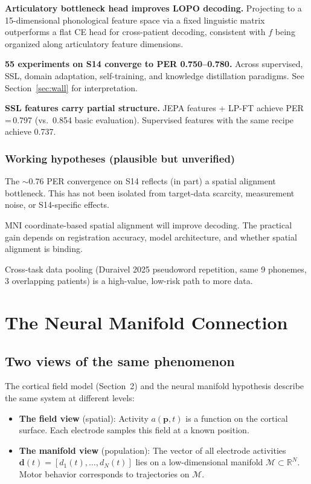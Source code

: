 \documentclass[11pt,letterpaper]{article}
\newcommand{\bfp}{\mathbf{p}}
\newcommand{\bfd}{\mathbf{d}}
\newcommand{\cM}{\mathcal{M}}
\newcommand{\R}{\mathbb{R}}
\begin{document}
\textbf{Articulatory bottleneck head improves LOPO decoding.} Projecting to a 15-dimensional phonological feature space via a fixed linguistic matrix outperforms a flat CE head for cross-patient decoding, consistent with $f$ being organized along articulatory feature dimensions.

\textbf{55 experiments on S14 converge to PER 0.750--0.780.} Across supervised, SSL, domain adaptation, self-training, and knowledge distillation paradigms. See Section~\ref{sec:wall} for interpretation.

\textbf{SSL features carry partial structure.} JEPA features + LP-FT achieve PER\,=\,0.797 (vs.\ 0.854 basic evaluation). Supervised features with the same recipe achieve 0.737.

\subsubsection{Working hypotheses (plausible but unverified)}

The ${\sim}0.76$ PER convergence on S14 reflects (in part) a spatial alignment bottleneck. This has not been isolated from target-data scarcity, measurement noise, or S14-specific effects.

MNI coordinate-based spatial alignment will improve decoding. The practical gain depends on registration accuracy, model architecture, and whether spatial alignment is binding.

Cross-task data pooling (Duraivel 2025 pseudoword repetition, same 9 phonemes, 3 overlapping patients) is a high-value, low-risk path to more data.


\section{The Neural Manifold Connection}

\subsection{Two views of the same phenomenon}

The cortical field model (Section~2) and the neural manifold hypothesis describe the same system at different levels:
\begin{itemize}[leftmargin=2em]
\item \textbf{The field view} (spatial): Activity $a(\bfp, t)$ is a function on the cortical surface. Each electrode samples this field at a known position.
\item \textbf{The manifold view} (population): The vector of all electrode activities $\bfd(t) = [d_1(t), \ldots, d_N(t)]$ lies on a low-dimensional manifold $\cM \subset \R^N$. Motor behavior corresponds to trajectories on $\cM$.
\end{itemize}
\end{document}

